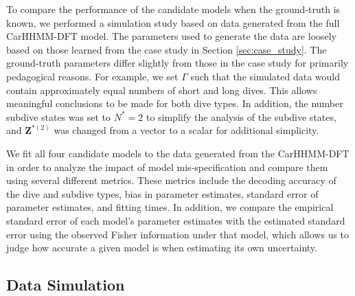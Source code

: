 

To compare the performance of the candidate models when the ground-truth is known, we performed a simulation study based on data generated from the full CarHHMM-DFT model. The parameters used to generate the data are loosely based on those learned from the case study in Section \ref{sec:case_study}. The ground-truth parameters differ slightly from those in the case study for primarily pedagogical reasons. For example, we set $\Gamma$ such that the simulated data would contain approximately equal numbers of short and long dives. This allows meaningful conclusions to be made for both dive types. In addition, the number subdive states was set to $N^*=2$ to simplify the analysis of the subdive states, and $\mathbf{Z}^{*(2)}$ was changed from a vector to a scalar for additional simplicity. 

We fit all four candidate models to the data generated from the CarHHMM-DFT in order to analyze the impact of model mis-specification and compare them using several different metrics. These metrics include the decoding accuracy of the dive and subdive types, bias in parameter estimates, standard error of parameter estimates, and fitting times. In addition, we compare the empirical standard error of each model's parameter estimates with the estimated standard error using the observed Fisher information under that model, which allows us to judge how accurate a given model is when estimating its own uncertainty.

\subsection{Data Simulation}

